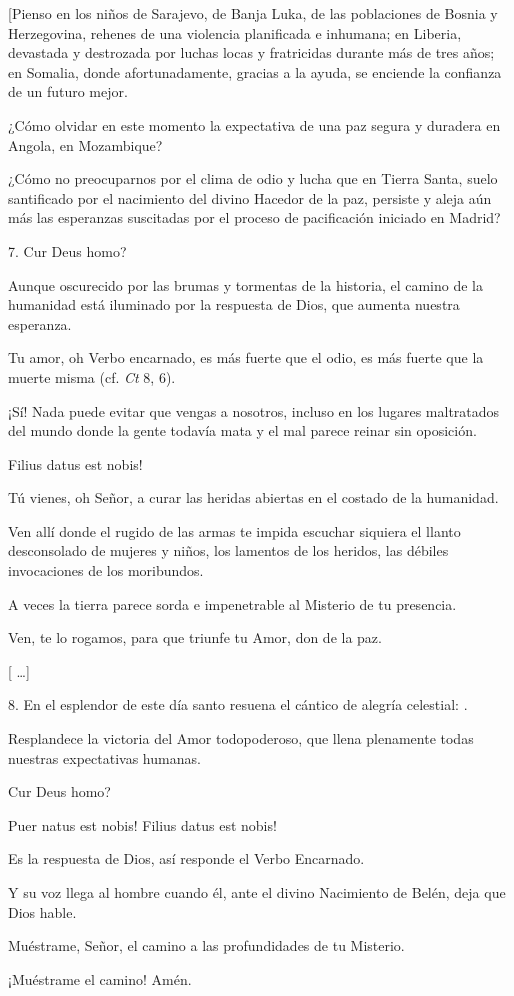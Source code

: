 \begin{body}
	{[}Pienso en los niños de Sarajevo, de Banja Luka, de las poblaciones de Bosnia y Herzegovina, rehenes de una violencia planificada e inhumana; en Liberia, devastada y destrozada por luchas locas y fratricidas durante más de tres años; en Somalia, donde afortunadamente, gracias a la ayuda, se enciende la confianza de un futuro mejor.
	
	¿Cómo olvidar en este momento la expectativa de una paz segura y duradera en Angola, en Mozambique?
	
	¿Cómo no preocuparnos por el clima de odio y lucha que en Tierra Santa, suelo santificado por el nacimiento del divino Hacedor de la paz, persiste y aleja aún más las esperanzas suscitadas por el proceso de pacificación iniciado en Madrid?
	
	7. Cur Deus homo?
	
	Aunque oscurecido por las brumas y tormentas de la historia, el camino de la humanidad está iluminado por la respuesta de Dios, que aumenta nuestra esperanza.
	
	Tu amor, oh Verbo encarnado, es más fuerte que el odio, es más fuerte que la muerte misma (cf. \emph{Ct} 8, 6).
	
	¡Sí! Nada puede evitar que vengas a nosotros, incluso en los lugares maltratados del mundo donde la gente todavía mata y el mal parece reinar sin oposición.
	
	Filius datus est nobis!
	
	Tú vienes, oh Señor, a curar las heridas abiertas en el costado de la humanidad.
	
	Ven allí donde el rugido de las armas te impida escuchar siquiera el llanto desconsolado de mujeres y niños, los lamentos de los heridos, las débiles invocaciones de los moribundos.
	
	A veces la tierra parece sorda e impenetrable al Misterio de tu presencia.
	
	Ven, te lo rogamos, para que triunfe tu Amor, don de la paz.
	
	{[} \ldots{}{]}
	
	8. En el esplendor de este día santo resuena el cántico de alegría celestial: .
	
	Resplandece la victoria del Amor todopoderoso, que llena plenamente todas nuestras expectativas humanas.
	
	Cur Deus homo?
	
	Puer natus est nobis! Filius datus est nobis!
	
	Es la respuesta de Dios, así responde el Verbo Encarnado.
	
	Y su voz llega al hombre cuando él, ante el divino Nacimiento de Belén, deja que Dios hable.
	
	Muéstrame, Señor, el camino a las profundidades de tu Misterio.
	
	¡Muéstrame el camino! Amén.
\end{body}

